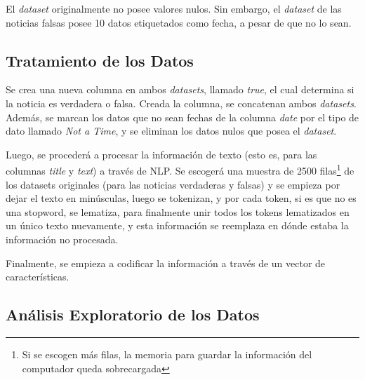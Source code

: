 {El \textit{dataset} originalmente no posee valores nulos. Sin embargo, el \textit{dataset} de las noticias falsas posee 10 datos etiquetados como fecha, a pesar de que no lo sean.


\subsection{Tratamiento de los Datos}

Se crea una nueva columna en ambos \textit{datasets}, llamado \textit{true}, el cual determina si la noticia es verdadera o falsa. Creada la columna, se concatenan ambos \textit{datasets}. Además, se marcan los datos que no sean fechas de la columna \textit{date} por el tipo de dato llamado \textit{Not a Time}, y se eliminan los datos nulos que posea el \textit{dataset}.

Luego, se procederá a procesar la información de texto (esto es, para las columnas \textit{title} y \textit{text}) a través de NLP. Se escogerá una muestra de 2500 filas\footnote{Si se escogen más filas, la memoria para guardar la información del computador queda sobrecargada} de los datasets originales (para las noticias verdaderas y falsas) y se empieza por dejar el texto en minúsculas, luego se tokenizan, y por cada token, si es que no es una stopword, se lematiza, para finalmente unir todos los tokens lematizados en un único texto nuevamente, y esta información se reemplaza en dónde estaba la información no procesada.

Finalmente, se empieza a codificar la información a través de un vector de características. 

\subsection{Análisis Exploratorio de los Datos}

}
